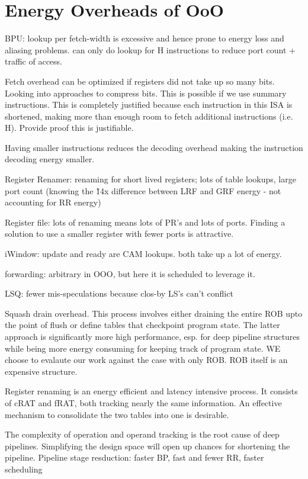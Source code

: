 \section{Energy Overheads of OoO}
\label{sec:o3_overhead}

BPU: lookup per fetch-width is excessive and hence prone to energy loss and
aliasing problems. can only do lookup for H instructions
to reduce port count + traffic of access.

Fetch overhead can be optimized if registers did not take up so many bits.
Looking into approaches to compress bits. This is possible if we use summary
instructions. This is completely justified because each instruction in this ISA
is shortened, making more than enough room to fetch additional instructions
(i.e.  H). Provide proof this is justifiable.
 
Having smaller instructions reduces the decoding overhead making the instruction
decoding energy smaller.

Register Renamer: renaming for short lived registers; lots of table lookups,
         large port count (knowing the \~14x difference between LRF and GRF
                 energy - not accounting for RR energy)

Register file: lots of renaming means lots of PR's and lots of ports. Finding a
solution to use a smaller register with fewer ports is attractive.

iWindow: update and ready are CAM lookups. both take up a lot of energy.

forwarding: arbitrary in OOO, but here it is scheduled to leverage it.

LSQ: fewer mis-speculations because clos-by LS's can't conflict

Squash drain overhead. This process involves either draining the entire ROB upto
the point of flush or define tables that checkpoint program state. The latter
approach is significantly more high performance, esp. for deep pipeline
structures while being more energy consuming for keeping track of program state.
WE choose to evalaute our work against the case with only ROB. ROB itself is an
expensive structure.

Register renaming is an energy efficient and latency intensive process. It
consists of cRAT and fRAT, both tracking nearly the same information. An
effective mechanism to consolidate the two tables into one is desirable.

The complexity of operation and operand tracking is the root cause of deep
pipelines. Simplifying the design space will open up chances for shortening the
pipeline. Pipeline stage resduction: faster BP, fast and fewer RR, faster scheduling

